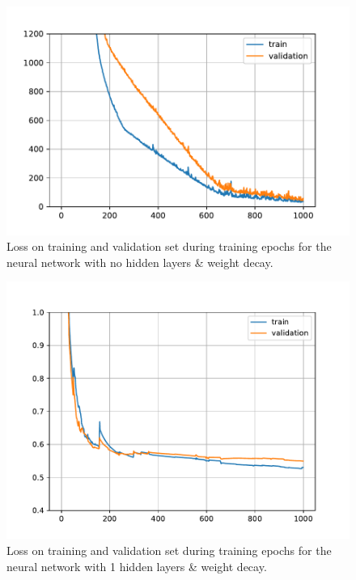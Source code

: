 \begin{figure}[h!]
    \centering
    \includegraphics[width=\textwidth]{pics/figure_Credit_NN_nohidden_wd_loss.pdf}
    \caption{Loss on training and validation set during training epochs for the neural network with no hidden layers \& weight decay.}
    \label{fig:Credit_NN_nohidden_wd_loss}
\end{figure}

\begin{figure}
    \centering
    \includegraphics[width=\textwidth]{pics/figure_Credit_NN_1hidden_wd_loss.pdf}
    \caption{Loss on training and validation set during training epochs for the neural network with 1 hidden layers \& weight decay. }
    \label{fig:Credit_NN_1hidden_wd_loss}
\end{figure}


